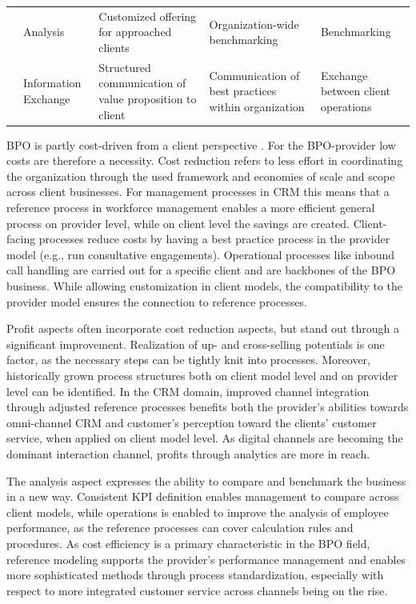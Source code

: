 \begin{table}[caption={Benefits of Reference Modelling for BPO-providers in CRM }, label=tab:refmodbpobenefits]
\begin{tabular}{p{1cm} p{2cm} |p{3cm} | p{3cm} | p{3cm} |}
		\multicolumn{1}{|l|}{}                                   & Analysis                            & Customized offering for approached clients              & Organization-wide benchmarking                     & Benchmarking                                                        \\ \cline{2-5} 
		\multicolumn{1}{|l|}{}                                   & Information Exchange                & Structured communication of value proposition to client & Communication of best practices within organization & Exchange between client operations                                  \\ \hline
	\end{tabular}
\end{table}

BPO is partly cost-driven from a client perspective \cite{schewe2007}. For the BPO-provider low costs are therefore a necessity. Cost reduction refers to less effort in coordinating the organization through the used framework and economies of scale and scope across client businesses. For management processes in CRM this means that a reference process in workforce management enables a more efficient general process on provider level, while on client level the savings are created. Client-facing processes reduce costs by having a best practice process in the provider model (e.g., run consultative engagements). Operational processes like inbound call handling are carried out for a specific client and are backbones of the BPO business. While allowing customization in client models, the compatibility to the provider model ensures the connection to reference processes.

Profit aspects often incorporate cost reduction aspects, but stand out through a significant improvement. Realization of up- and cross-selling potentials is one factor, as the necessary steps can be tightly knit into processes. Moreover, historically grown process structures both on client model level and on provider level can be identified. In the CRM domain, improved channel integration through adjusted reference processes benefits both the provider’s abilities towards omni-channel CRM and customer’s perception toward the clients’ customer service, when applied on client model level. As digital channels are becoming the dominant interaction channel, profits through analytics are more in reach.

The analysis aspect expresses the ability to compare and benchmark the business in a new way. Consistent KPI definition enables management to compare across client models, while operations is enabled to improve the analysis of employee performance, as the reference processes can cover calculation rules and procedures. As cost efficiency is a primary characteristic in the BPO field, reference modeling supports the provider’s performance management and enables more sophisticated methods through process standardization, especially with respect to more integrated customer service across channels being on the rise.

